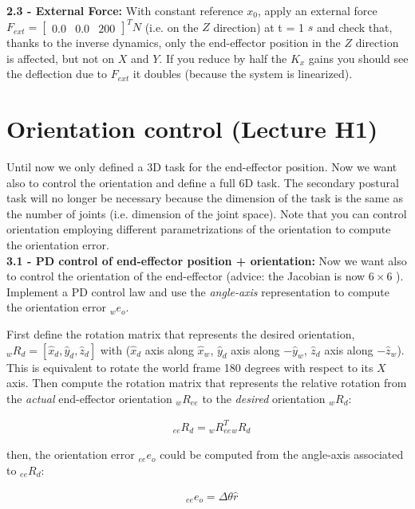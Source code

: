 \documentclass[11pt]{article}
\newcommand{\mat}[1]{\ensuremath{\begin{bmatrix}#1\end{bmatrix}}}	%
\begin{document}
\textbf{2.3 - External Force:}
With constant reference $x_0$,  apply an external force  $F_{ext} = \mat{0.0 & 0.0 & 200}^T N$ (i.e. on the
$Z$ direction) at t = 1 $s$ and check that, thanks to the inverse dynamics, 
only the end-effector position in the $Z$ direction is affected, but not on $X$ and $Y$. 
If you reduce by half the $K_x$ gains you should see the deflection due to $F_{ext}$ 
it doubles (because the system is linearized).


\section{Orientation control (Lecture H1)}

Until now we only defined a 3D task for the end-effector position. Now we want also to control the orientation and define a full 6D task. 
The secondary postural task will no longer be necessary because the dimension of the task is the same as the number of joints (i.e. dimension of the joint space). Note that you can control orientation employing different parametrizations of the orientation to compute the orientation error. \\


\textbf{3.1 - PD control of end-effector position + orientation:}
Now we want also to control  the orientation  of the end-effector (advice: the Jacobian is now $6\times6$ ). 
Implement a PD control law and use the \textit{angle-axis} representation to compute the orientation error ${}_we_o$. 

First define the rotation matrix that represents the desired orientation, ${}_wR_d = [\hat{x}_d, \hat{y}_d, \hat{z}_d]$ with  ($\hat{x}_d$ axis along $\hat{x}_w$, $\hat{y}_d$ axis  along $-\hat{y}_w$, $\hat{z}_d$ axis along $-\hat{z}_w$). This is equivalent to rotate the world frame 180 degrees with respect to its $X$ axis. %
Then compute the rotation matrix that represents the relative rotation from the \textit{actual} end-effector orientation ${}_wR_{ee}$ to the \textit{desired} orientation ${}_wR_d$:

\begin{align}
&{}_{ee}R_d = {}_wR_{ee}^T {}_wR_d
\end{align}

then, the orientation error ${}_{ee}e_o$ could be computed from the angle-axis associated to ${}_{ee}R_d$:


\begin{align}
& {}_{ee}e_o = \Delta\theta \hat{r}
\end{align}
\end{document}
